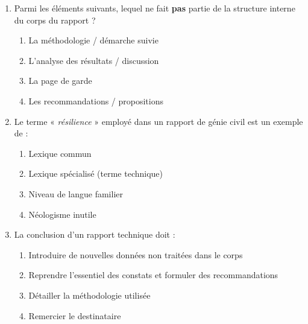 \documentclass[11pt]{article}
\begin{document}
\begin{exercice}
\begin{enumerate}
    \item Parmi les éléments suivants, lequel ne fait \textbf{pas} partie de la structure interne du corps du rapport ?
    \begin{enumerate}
        \item La méthodologie / démarche suivie
        \item L'analyse des résultats / discussion
        \item La page de garde
        \item Les recommandations / propositions
    \end{enumerate}
    \item Le terme « \textit{résilience} » employé dans un rapport de génie civil est un exemple de :
    \begin{enumerate}
        \item Lexique commun
        \item Lexique spécialisé (terme technique)
        \item Niveau de langue familier
        \item Néologisme inutile
    \end{enumerate}
    \item La conclusion d'un rapport technique doit :
    \begin{enumerate}
        \item Introduire de nouvelles données non traitées dans le corps
        \item Reprendre l'essentiel des constats et formuler des recommandations
        \item Détailler la méthodologie utilisée
        \item Remercier le destinataire
    \end{enumerate}
\end{enumerate}
\end{exercice}
\end{document}
